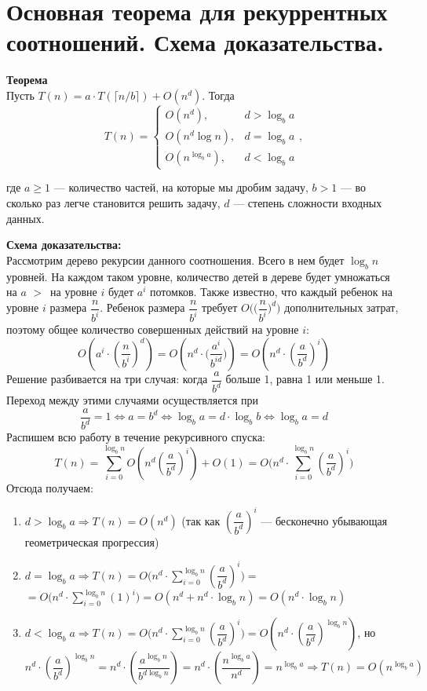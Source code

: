 \section{Основная теорема для рекуррентных соотношений. Схема доказательства.}

\textbf{Теорема\\}
 Пусть $T(n)=a\cdot T(\lceil n/b\rceil)+O(n^d)$. Тогда
$$
T(n)=\begin{cases}O(n^d), &d>\log_ba\\O(n^d\log n), &d=\log_ba\\O(n^{\log_ba}), &d<\log_ba\end{cases},
$$

где $a \ge 1$ --- количество частей, на которые мы дробим задачу, $b>1$ --- во сколько раз легче становится решить задачу, $d$ --- степень сложности входных данных.



\textbf{Схема доказательства:}\\
Рассмотрим дерево рекурсии данного соотношения. Всего в нем будет $\log_bn$ уровней. На каждом таком уровне, количество детей в дереве будет умножаться на $a$ $>$~на уровне $i$ будет $a^i$ потомков. Также известно, что каждый ребенок на уровне $i$ размера $\dfrac{n}{b^i}$. Ребенок размера $\dfrac{n}{b^i}$ требует $O\bigg(\Big(\dfrac{n}{b^i}\Big)^d\bigg)$ дополнительных затрат, поэтому общее количество совершенных действий на уровне $i$: $$O\left(a^i\cdot\left(\frac{n}{b^i}\right)^d\right)=O\left(n^d\cdot\Big(\frac{a^i}{b^{id}}\Big)\right)=O\left(n^d\cdot\left(\frac{a}{b^d}\right)^i\right)$$
Решение разбивается на три случая: когда $\dfrac{a}{b^d}$ больше 1, равна 1 или меньше 1. Переход между этими случаями осуществляется при
$$\frac{a}{b^d}=1\Leftrightarrow a=b^d\Leftrightarrow\log_ba=d\cdot\log_bb\Leftrightarrow\log_ba=d$$
Распишем всю работу в течение рекурсивного спуска:
$$T(n)=\sum\limits_{i=0}^{\log_bn}O\left(n^d\left(\frac{a}{b^d}\right)^i\right)+O(1)=O\Bigg(n^d\cdot\sum\limits_{i=0}^{\log_bn}\left(\frac{a}{b^d}\right)^i\Bigg)$$
Отсюда получаем:
\begin{enumerate}
	\item $d>\log_ba\Rightarrow T(n)=O(n^d)$ (так как $\left(\dfrac{a}{b^d}\right)^i$ --- бесконечно убывающая геометрическая прогрессия)
	\item $d=\log_ba\Rightarrow T(n)=O\Bigg(n^d\cdot\sum\limits_{i=0}^{\log_bn}\left(\dfrac{a}{b^d}\right)^i\Bigg)=$\\
	$=O\Bigg(n^d\cdot\sum\limits_{i=0}^{\log_bn}\left(1\right)^i\Bigg)=O(n^d+n^d\cdot\log_bn)=O(n^d\cdot\log_bn)$
	\item $d<\log_ba\Rightarrow T(n)=O\Bigg(n^d\cdot\sum\limits_{i=0}^{\log_bn}\left(\dfrac{a}{b^d}\right)^i\Bigg)=O\left(n^d\cdot\left(\dfrac{a}{b^d}\right)^{\log_bn}\right)$, но $$n^d\cdot\left(\frac{a}{b^d}\right)^{\log_bn}=n^d\cdot\left(\frac{a^{\log_bn}}{b^{d\log_bn}}\right)=n^d\cdot\left(\frac{n^{\log_ba}}{n^d}\right)=n^{\log_ba}\Rightarrow T(n)=O(n^{\log_ba})$$
\end{enumerate}